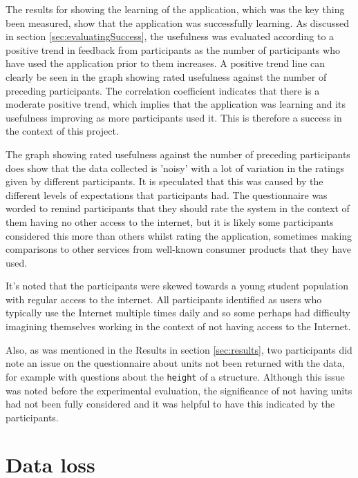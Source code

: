 \documentclass[authoryearcitations]{UoYCSproject}
\begin{document}

The results for showing the learning of the application, which was the key thing been measured, show that the application was successfully learning. As discussed in section \ref{sec:evaluatingSuccess}, the usefulness was evaluated according to a positive trend in feedback from participants as the number of participants who have used the application prior to them increases. A positive trend line can clearly be seen in the graph showing rated usefulness against the number of preceding participants. The correlation coefficient indicates that there is a moderate positive trend, which implies that the application was learning and its usefulness improving as more participants used it. This is therefore a success in the context of this project.

The graph showing rated usefulness against the number of preceding participants does show that the data collected is 'noisy' with a lot of variation in the ratings given by different participants. It is speculated that this was caused by the different levels of expectations that participants had. The questionnaire was worded to remind participants that they should rate the system in the context of them having no other access to the internet, but it is likely some participants considered this more than others whilst rating the application, sometimes making comparisons to other services from well-known consumer products that they have used.

It's noted that the participants were skewed towards a young student population with regular access to the internet. All participants identified as users who typically use the Internet multiple times daily and so some perhaps had difficulty imagining themselves working in the context of not having access to the Internet.

Also, as was mentioned in the Results in section \ref{sec:results}, two participants did note an issue on the questionnaire about units not been returned with the data, for example with questions about the \texttt{height} of a structure. Although this issue was noted before the experimental evaluation, the significance of not having units had not been fully considered and it was helpful to have this indicated by the participants.


\section{Data loss}
\label{sec:dataLoss}
\end{document}
